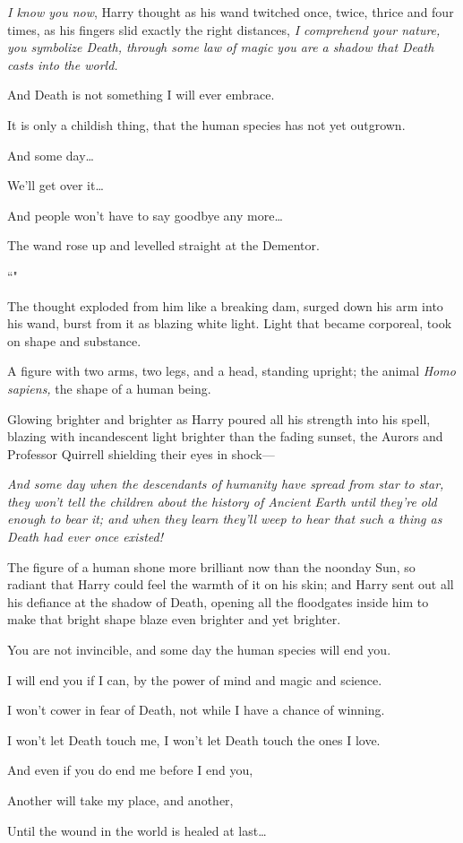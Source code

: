 \emph{I know you now}, Harry thought as his wand twitched once, twice, thrice and four times, as his fingers slid exactly the right distances, \emph{I comprehend your nature, you symbolize Death, through some law of magic you are a shadow that Death casts into the world.}

\begin{em}
And Death is not something I will ever embrace.

It is only a childish thing, that the human species has not yet outgrown.

And some day{\ldots}

We'll get over it{\ldots}

And people won't have to say goodbye any more{\ldots}
\end{em}

The wand rose up and levelled straight at the Dementor.

``\emph{}"

The thought exploded from him like a breaking dam, surged down his arm into his wand, burst from it as blazing white light. Light that became corporeal, took on shape and substance.

A figure with two arms, two legs, and a head, standing upright; the animal \emph{Homo sapiens,} the shape of a human being.

Glowing brighter and brighter as Harry poured all his strength into his spell, blazing with incandescent light brighter than the fading sunset, the Aurors and Professor Quirrell shielding their eyes in shock—

\emph{And some day when the descendants of humanity have spread from star to star, they won't tell the children about the history of Ancient Earth until they're old enough to bear it; and when they learn they'll weep to hear that such a thing as Death had ever once existed!}

The figure of a human shone more brilliant now than the noonday Sun, so radiant that Harry could feel the warmth of it on his skin; and Harry sent out all his defiance at the shadow of Death, opening all the floodgates inside him to make that bright shape blaze even brighter and yet brighter.

\begin{em}
You are not invincible, and some day the human species will end you.

I will end you if I can, by the power of mind and magic and science.

I won't cower in fear of Death, not while I have a chance of winning.

I won't let Death touch me, I won't let Death touch the ones I love.

And even if you do end me before I end you,

Another will take my place, and another,

Until the wound in the world is healed at last{\ldots}
\end{em}

